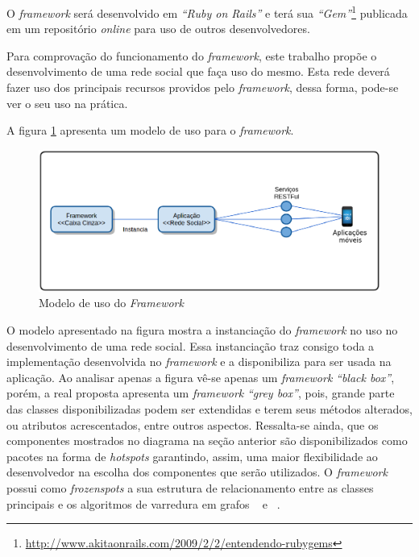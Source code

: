 O \textit{framework} será desenvolvido em \textit{``Ruby on Rails''} e terá sua \textit{``Gem''}\footnote{\url{http://www.akitaonrails.com/2009/2/2/entendendo-rubygems}} publicada em um repositório \textit{online} para uso de outros desenvolvedores.

Para comprovação do funcionamento do \textit{framework}, este trabalho propõe o desenvolvimento de uma rede social que faça uso do mesmo. Esta rede deverá fazer uso dos principais recursos providos pelo \textit{framework}, dessa forma, pode-se ver o seu uso na prática.

A figura \ref{uso_proposto} apresenta um modelo de uso para o \textit{framework}.

\begin{figure}[!h]
	\centering
	\includegraphics[scale=0.45]{figuras/capitulo5/uso_proposto.eps}
	\caption{Modelo de uso do \textit{Framework}}
	\label{uso_proposto}
\end{figure}

O modelo apresentado na figura mostra a instanciação do \textit{framework} no uso no desenvolvimento de uma rede social. Essa instanciação traz consigo toda a implementação desenvolvida no \textit{framework} e a disponibiliza para ser usada na aplicação. Ao analisar apenas a figura vê-se apenas um \textit{framework} \textit{``black box''}, porém, a real proposta apresenta um \textit{framework} \textit{``grey box''}, pois, grande parte das classes disponibilizadas podem ser extendidas e terem seus métodos alterados, ou atributos acrescentados, entre outros aspectos. Ressalta-se ainda, que os componentes mostrados no diagrama na seção anterior são disponibilizados como pacotes na forma de \textit{hotspots} \cite{Franca:2001} garantindo, assim, uma maior flexibilidade ao desenvolvedor na escolha dos componentes que serão utilizados. O \textit{framework} possui como \textit{frozenspots} \cite{Franca:2001} a sua estrutura de relacionamento entre as classes principais e os algoritmos de varredura em grafos ~ e ~.

